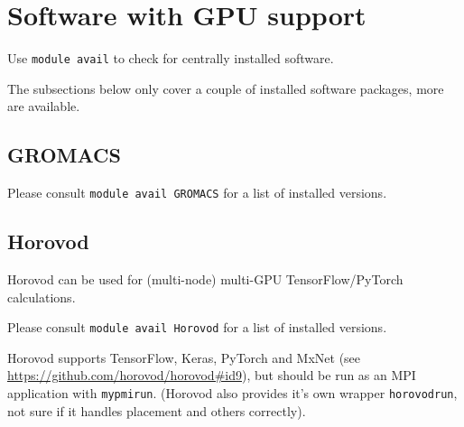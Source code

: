 




\section{Software with GPU support}
\label{sec:gpu_ugent_software}

Use \lstinline|module avail| to check for centrally installed software.

The subsections below only cover a couple of installed software packages, more are available.





\subsection{GROMACS}
\label{sec:gpu_ugent_software_gromacs}

Please consult \lstinline|module avail GROMACS| for a list of installed versions.




\subsection{Horovod}
\label{sec:gpu_ugent_software_horovod}

Horovod can be used for (multi-node) multi-GPU TensorFlow/PyTorch calculations.

Please consult \lstinline|module avail Horovod| for a list of installed versions.

Horovod supports TensorFlow, Keras, PyTorch and MxNet (see \url{https://github.com/horovod/horovod#id9}), but should be run as an MPI application with \lstinline|mypmirun|.
(Horovod also provides it's own wrapper \lstinline|horovodrun|, not sure if it handles placement and others correctly).

